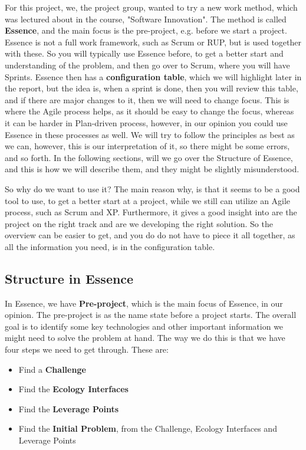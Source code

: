 For this project, we, the project group, wanted to try a new work method, which was lectured about in the course, "Software Innovation".
The method is called \textbf{Essence}, and the main focus is the pre-project, e.g. before we start a project.
Essence is not a full work framework, such as Scrum or RUP, but is used together with these.
So you will typically use Essence before, to get a better start and understanding of the problem, and then go over to Scrum, where you will have Sprints. 
Essence then has a \textbf{configuration table}, which we will highlight later in the report, but the idea is, when a sprint is done, then you will review this table, and if there are major changes to it, then we will need to change focus.
This is where the Agile process helps, as it should be easy to change the focus, whereas it can be harder in Plan-driven process, however, in our opinion you could use Essence in these processes as well. 
We will try to follow the principles as best as we can, however, this is our interpretation of it, so there might be some errors, and so forth.
In the following sections, will we go over the Structure of Essence, and this is how we will describe them, and they might be slightly misunderstood.

So why do we want to use it?
The main reason why, is that it seems to be a good tool to use, to get a better start at a project, while we still can utilize an Agile process, such as Scrum and XP.
Furthermore, it gives a good insight into are the project on the right track and are we developing the right solution.
So the overview can be easier to get, and you do do not have to piece it all together, as all the information you need, is in the configuration table.

\subsection{Structure in Essence}
In Essence, we have \textbf{Pre-project}, which is the main focus of Essence, in our opinion.
The pre-project is as the name state before a project starts. 
The overall goal is to identify some key technologies and other important information we might need to solve the problem at hand.
The way we do this is that we have four steps we need to get through.
These are:

\begin{itemize}
    \item Find a \textbf{Challenge}
    \item Find the \textbf{Ecology Interfaces}
    \item Find the \textbf{Leverage Points}
    \item Find the \textbf{Initial Problem}, from the Challenge, Ecology Interfaces and Leverage Points
\end{itemize}

